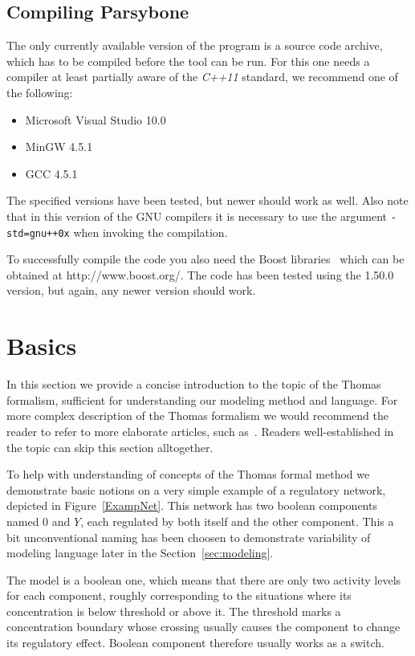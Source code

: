 \documentclass[12pt]{article}
\begin{document}
\subsection{Compiling Parsybone}
The only currently available version of the program is a source code archive, which has to be compiled before the tool can be run. For this one needs a compiler at least partially aware of the \emph{C++11} standard, we recommend one of the following:
\begin{itemize}
\item Microsoft Visual Studio 10.0
\item MinGW 4.5.1
\item GCC 4.5.1 
\end{itemize}
The specified versions have been tested, but newer should work as well. Also note that in this version of the GNU compilers it is necessary to use the argument \texttt{-std=gnu++0x} when invoking the compilation.

To successfully compile the code you also need the Boost libraries~\cite{Boost} which can be obtained at http://www.boost.org/. The code has been tested using the 1.50.0 version, but again, any newer version should work.

\section{Basics}
In this section we provide a concise introduction to the topic of the Thomas formalism, sufficient for understanding our modeling method and language. For more complex description of the Thomas formalism we would recommend the reader to refer to more elaborate articles, such as~\cite{ThomasR1991}. Readers well-established in the topic can skip this section alltogether.

To help with understanding of concepts of the Thomas formal method we demonstrate basic notions on a very simple example of a regulatory network, depicted in Figure~\ref{ExampNet}. This network has two boolean components named $0$ and $Y$, each regulated by both itself and the other component. This a bit unconventional naming has been choosen to demonstrate variability of modeling language later in the Section~\ref{sec:modeling}.

The model is a boolean one, which means that there are only two activity levels for each component, roughly corresponding to the situations where its concentration is below threshold or above it. The threshold marks a concentration boundary whose crossing usually causes the component to change its regulatory effect. Boolean component therefore usually works as a switch.
\end{document}
